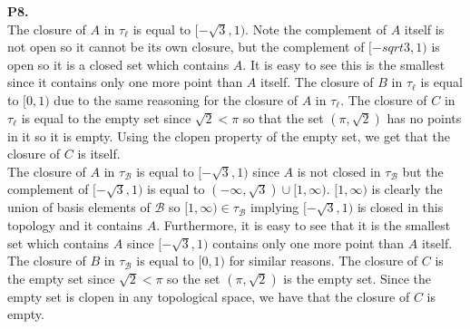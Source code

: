 \documentclass{article}
\begin{document}
    \textbf{P8.}\\
    The closure of $A$ in $\tau_{\ell}$ is equal to $[-\sqrt{3},1)$. Note the complement of $A$ itself is not open so it
    cannot be its own closure, but the complement of $[-sqrt{3},1)$ is open so it is a closed set which contains $A$. It is
    easy to see this is the smallest since it contains only one more point than $A$ itself. The closure of $B$ in $\tau_{\ell}$
    is equal to $[0,1)$ due to the same reasoning for the closure of $A$ in $\tau_{\ell}$. The closure of $C$ in $\tau_{\ell}$
    is equal to the empty set since $\sqrt{2}<\pi$ so that the set $(\pi,\sqrt{2})$ has no points in it so it is empty. Using
    the clopen property of the empty set, we get that the closure of $C$ is itself.\\
    The closure of $A$ in $\tau_{\mathcal{B}}$ is equal to $[-\sqrt{3},1)$ since $A$ is not closed in $\tau_{\mathcal{B}}$
    but the complement of $[-\sqrt{3},1)$ is equal to $(-\infty,\sqrt{3})\cup[1,\infty)$. $[1,\infty)$ is clearly the union
    of basis elements of $\mathcal{B}$ so $[1,\infty)\in\tau_{\mathcal{B}}$ implying $[-\sqrt{3},1)$ is closed in this topology
    and it contains $A$. Furthermore, it is easy to see that it is the smallest set which contains $A$ since $[-\sqrt{3},1)$ contains
    only one more point than $A$ itself. The closure of $B$ in $\tau_{\mathcal{B}}$ is equal to $[0,1)$ for similar reasons.
    The closure of $C$ is the empty set since $\sqrt{2} < \pi$ so the set $(\pi,\sqrt{2})$ is the empty set. Since the empty set
    is clopen in any topological space, we have that the closure of $C$ is empty.
\end{document}
